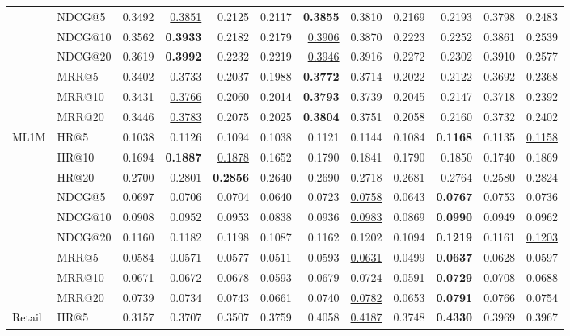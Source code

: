 \begin{tabular}{llrrrrrrrrrr}
 & NDCG@5 & 0.3492 & \underline{0.3851} & 0.2125 & 0.2117 & \textbf{0.3855} & 0.3810 & 0.2169 & 0.2193 & 0.3798 & 0.2483 \\
 & NDCG@10 & 0.3562 & \textbf{0.3933} & 0.2182 & 0.2179 & \underline{0.3906} & 0.3870 & 0.2223 & 0.2252 & 0.3861 & 0.2539 \\
 & NDCG@20 & 0.3619 & \textbf{0.3992} & 0.2232 & 0.2219 & \underline{0.3946} & 0.3916 & 0.2272 & 0.2302 & 0.3910 & 0.2577 \\
 & MRR@5 & 0.3402 & \underline{0.3733} & 0.2037 & 0.1988 & \textbf{0.3772} & 0.3714 & 0.2022 & 0.2122 & 0.3692 & 0.2368 \\
 & MRR@10 & 0.3431 & \underline{0.3766} & 0.2060 & 0.2014 & \textbf{0.3793} & 0.3739 & 0.2045 & 0.2147 & 0.3718 & 0.2392 \\
 & MRR@20 & 0.3446 & \underline{0.3783} & 0.2075 & 0.2025 & \textbf{0.3804} & 0.3751 & 0.2058 & 0.2160 & 0.3732 & 0.2402 \\
\hline
ML1M & HR@5 & 0.1038 & 0.1126 & 0.1094 & 0.1038 & 0.1121 & 0.1144 & 0.1084 & \textbf{0.1168} & 0.1135 & \underline{0.1158} \\
 & HR@10 & 0.1694 & \textbf{0.1887} & \underline{0.1878} & 0.1652 & 0.1790 & 0.1841 & 0.1790 & 0.1850 & 0.1740 & 0.1869 \\
 & HR@20 & 0.2700 & 0.2801 & \textbf{0.2856} & 0.2640 & 0.2690 & 0.2718 & 0.2681 & 0.2764 & 0.2580 & \underline{0.2824} \\
 & NDCG@5 & 0.0697 & 0.0706 & 0.0704 & 0.0640 & 0.0723 & \underline{0.0758} & 0.0643 & \textbf{0.0767} & 0.0753 & 0.0736 \\
 & NDCG@10 & 0.0908 & 0.0952 & 0.0953 & 0.0838 & 0.0936 & \underline{0.0983} & 0.0869 & \textbf{0.0990} & 0.0949 & 0.0962 \\
 & NDCG@20 & 0.1160 & 0.1182 & 0.1198 & 0.1087 & 0.1162 & 0.1202 & 0.1094 & \textbf{0.1219} & 0.1161 & \underline{0.1203} \\
 & MRR@5 & 0.0584 & 0.0571 & 0.0577 & 0.0511 & 0.0593 & \underline{0.0631} & 0.0499 & \textbf{0.0637} & 0.0628 & 0.0597 \\
 & MRR@10 & 0.0671 & 0.0672 & 0.0678 & 0.0593 & 0.0679 & \underline{0.0724} & 0.0591 & \textbf{0.0729} & 0.0708 & 0.0688 \\
 & MRR@20 & 0.0739 & 0.0734 & 0.0743 & 0.0661 & 0.0740 & \underline{0.0782} & 0.0653 & \textbf{0.0791} & 0.0766 & 0.0754 \\
\hline
Retail & HR@5 & 0.3157 & 0.3707 & 0.3507 & 0.3759 & 0.4058 & \underline{0.4187} & 0.3748 & \textbf{0.4330} & 0.3969 & 0.3967 \\

\end{tabular}
